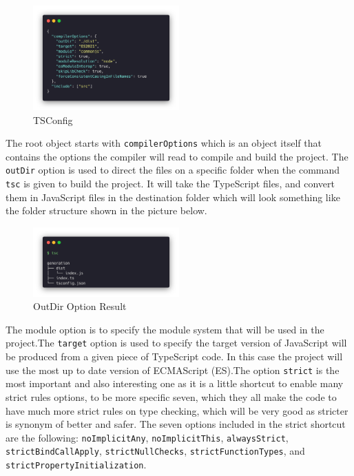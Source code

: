 \begin{figure}[H]
  \centering
  \includegraphics[width=0.5\textwidth]{figures/code/tsconfig.png}
  \caption{TSConfig}
  \label{f:ch5-refactored-tsconfig}
\end{figure}

The root object starts with \texttt{compilerOptions} which is an object itself
that contains the options the compiler will read to compile and build the project.
The \texttt{outDir} option is used to direct the files on a specific folder when
the command \texttt{tsc} is given to build the project. It will take the
TypeScript files, and convert them in JavaScript files in the destination folder
which will look something like the folder structure shown in the picture below.

\begin{figure}[H]
  \centering
  \includegraphics[width=0.5\textwidth]{figures/code/outdir.png}
  \caption{OutDir Option Result}
  \label{f:ch5-refactored-outdir}
\end{figure}

The module option is to specify the module system that will be used in the
project.The \texttt{target} option is used to specify the target version of
JavaScript will be produced from a given piece of TypeScript code. In this case
the project will use the most up to date version of ECMAScript (ES).The option
\texttt{strict} is the most important and also interesting one as it is a little
shortcut to enable many strict rules options, to be more specific seven, which
they all make the code to have much more strict rules on type checking, which
will be very good as stricter is synonym of better and safer. The seven options
included in the strict shortcut are the following: \texttt{noImplicitAny},
\texttt{noImplicitThis}, \texttt{alwaysStrict}, \texttt{strictBindCallApply},
\texttt{strictNullChecks}, \texttt{strictFunctionTypes}, and
\texttt{strictPropertyInitialization}.

